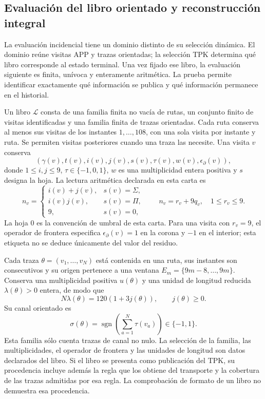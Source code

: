 \subsection{Evaluación del libro orientado y reconstrucción integral}
\label{vi:lib:seccion}

La evaluación incidencial tiene un dominio distinto de su selección
dinámica. El dominio reúne visitas APP y trazas orientadas; la selección
TPK determina qué libro corresponde al estado terminal. Una vez fijado
ese libro, la evaluación siguiente es finita, unívoca y enteramente
aritmética. La prueba permite identificar exactamente qué información
se publica y qué información permanece en el historial.

\begin{definition}
\label{vi:lib:dominio}
Un libro \(\mathscr L\) consta de una familia finita no vacía de rutas,
un conjunto finito de visitas identificadas y una familia finita de
trazas orientadas. Cada ruta conserva al menos sus visitas de los
instantes \(1,\ldots,108\), con una sola visita por instante y ruta.
Se permiten visitas posteriores cuando una traza las necesite. Una
visita \(v\) conserva
\[
 (\gamma(v),t(v),i(v),j(v),s(v),\tau(v),w(v),\epsilon_\partial(v)),
\]
donde \(1\le i,j\le9\), \(\tau\in\{-1,0,1\}\),
\(w\) es una multiplicidad entera positiva y \(s\) designa la hoja.
La lectura aritmética declarada en esta carta es
\[
 n_v=\begin{cases}
 i(v)+j(v),&s(v)=\Sigma,\\
 i(v)j(v),&s(v)=\Pi,\\
 9,&s(v)=0,
 \end{cases}
 \qquad n_v=r_v+9q_v,\quad1\le r_v\le9.
\]
La hoja \(0\) es la convención de umbral de esta carta. Para una visita
con \(r_v=9\), el operador de frontera especifica
\(\epsilon_\partial(v)=1\) en la corona y \(-1\) en el interior;
esta etiqueta no se deduce únicamente del valor del residuo.

Cada traza \(\theta=(v_1,\ldots,v_N)\) está contenida en una ruta,
sus instantes son consecutivos y su origen pertenece a una ventana
\(E_m=\{9m-8,\ldots,9m\}\). Conserva una multiplicidad positiva
\(u(\theta)\) y una unidad de longitud reducida \(\lambda(\theta)>0\)
entera, de modo que
\[
 N\lambda(\theta)=120(1+3j(\theta)),\qquad j(\theta)\ge0.
\]
Su canal orientado es
\[
 \sigma(\theta)=\operatorname{sgn}
       \left(\sum_{a=1}^{N}\tau(v_a)\right)\in\{-1,1\}.
\]
Esta familia sólo cuenta trazas de canal no nulo. La selección de la
familia, las multiplicidades, el operador de frontera y las unidades
de longitud son datos declarados del libro. Si el libro se presenta
como publicación del TPK, su procedencia incluye además la regla que
los obtiene del transporte y la cobertura de las trazas admitidas por
esa regla. La comprobación de formato de un libro no demuestra esa
procedencia.
\end{definition}

